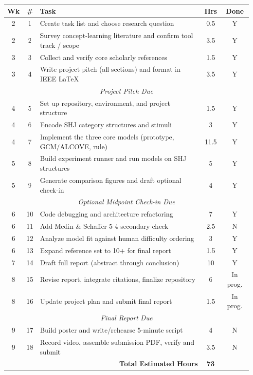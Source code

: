 \documentclass[conference]{IEEEtran}
\begin{document}
\begin{table}[h]
\footnotesize
\centering
\renewcommand{\arraystretch}{1.15}
\begin{tabular}{c c p{} c c}
\hline
\textbf{Wk} & \textbf{\#} & \textbf{Task} & \textbf{Hrs} & \textbf{Done} \\
\hline
2 & 1 & Create task list and choose research question & 0.5 & Y \\
2 & 2 & Survey concept-learning literature and confirm tool track / scope & 3.5 & Y \\
3 & 3 & Collect and verify core scholarly references & 1.5 & Y \\
3 & 4 & Write project pitch (all sections) and format in IEEE \LaTeX & 3.5 & Y \\
\hline
\multicolumn{5}{c}{\textit{Project Pitch Due}} \\
\hline
4 & 5 & Set up repository, environment, and project structure & 1.5 & Y \\
4 & 6 & Encode SHJ category structures and stimuli & 3 & Y \\
4 & 7 & Implement the three core models (prototype, GCM/ALCOVE, rule) & 11.5 & Y \\
5 & 8 & Build experiment runner and run models on SHJ structures & 5 & Y \\
5 & 9 & Generate comparison figures and draft optional check-in & 4 & Y \\
\hline
\multicolumn{5}{c}{\textit{Optional Midpoint Check-in Due}} \\
\hline
6 & 10 & Code debugging and architecture refactoring & 7 & Y \\
6 & 11 & Add Medin \& Schaffer 5-4 secondary check & 2.5 & N \\
6 & 12 & Analyze model fit against human difficulty ordering & 3 & Y \\
6 & 13 & Expand reference set to 10+ for final report & 1.5 & Y \\
7 & 14 & Draft full report (abstract through conclusion) & 10 & Y \\
8 & 15 & Revise report, integrate citations, finalize repository & 6 & In prog. \\
8 & 16 & Update project plan and submit final report & 1.5 & In prog. \\
\hline
\multicolumn{5}{c}{\textit{Final Report Due}} \\
\hline
9 & 17 & Build poster and write/rehearse 5-minute script & 4 & N \\
9 & 18 & Record video, assemble submission PDF, verify and submit & 3.5 & N \\
\hline
\multicolumn{3}{r}{\textbf{Total Estimated Hours}} & \textbf{73} & \\
\hline
\end{tabular}
\end{table}
\end{document}
